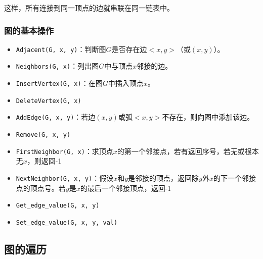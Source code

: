 \documentclass[12pt, a4paper, oneside]{ctexart}
\begin{document}
这样，所有连接到同一顶点的边就串联在同一链表中。

\subsubsection{图的基本操作}

\begin{itemize}
  \item \verb|Adjacent(G, x, y)|：判断图$G$是否存在边$<x, y>$（或$(x, y)$）。
  \item \verb|Neighbors(G, x)|：列出图$G$中与顶点$x$邻接的边。
  \item \verb|InsertVertex(G, x)|：在图$G$中插入顶点$x$。
  \item \verb|DeleteVertex(G, x)|
  \item \verb|AddEdge(G, x, y)|：若边$(x, y)$或弧$<x, y>$不存在，则向图中添加该边。
  \item \verb|Remove(G, x, y)|
  \item \verb|FirstNeighbor(G, x)|：求顶点$x$的第一个邻接点，若有返回序号，若无或根本无$x$，则返回-1
  \item \verb|NextNeighbor(G, x, y)|：假设$x$和$y$是邻接的顶点，返回除$y$外$x$的下一个邻接点的顶点号。若$y$是$x$的最后一个邻接顶点，返回-1
  \item \verb|Get_edge_value(G, x, y)|
  \item \verb|Set_edge_value(G, x, y, val)|
\end{itemize}

\subsection{图的遍历}
\end{document}
